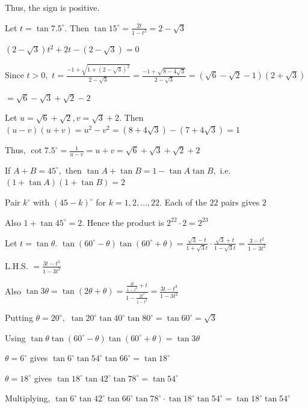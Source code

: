   Thus, the sign is positive.
\stopitemize

\subject{Challenging Problems}
\startitemize[n, 1*broad]
\item Let $t = \tan 7.5^\circ.$ Then $\tan 15^\circ = \frac{2t}{1 - t^2} = 2 - \sqrt{3}$

  $(2 - \sqrt{3})t^2 + 2t - (2 - \sqrt{3}) = 0$

  Since $t > 0,$ $t = \frac{-1 + \sqrt{1 + (2 - \sqrt{3})^2}}{2 - \sqrt{3}} = \frac{-1 + \sqrt{8 - 4\sqrt{3}}}{2 -
  \sqrt{3}} = (\sqrt{6} - \sqrt{2} - 1)(2 + \sqrt{3})$

  $= \sqrt{6} - \sqrt{3} + \sqrt{2} - 2$

  Let $u = \sqrt{6} + \sqrt{2}, v = \sqrt{3} + 2.$ Then $(u - v)(u + v) = u^2 - v^2 = (8 + 4\sqrt{3}) - (7 + 4\sqrt{3})
  = 1$

  Thus, $\cot 7.5^\circ = \frac{1}{u - v} = u + v = \sqrt{6} + \sqrt{3} + \sqrt{2} + 2$

\item If $A + B = 45^\circ,$ then $\tan A + \tan B = 1 - \tan A\tan B,$ i.e. $(1 + \tan A)(1 + \tan B) = 2$

  Pair $k^\circ$ with $(45 - k)^\circ$ for $k = 1, 2, \ldots, 22.$ Each of the $22$ pairs gives $2$

  Also $1 + \tan 45^\circ = 2.$ Hence the product is $2^{22}\cdot 2 = 2^{23}$

\item Let $t = \tan\theta.$ $\tan(60^\circ - \theta)\tan(60^\circ + \theta) = \frac{\sqrt{3} - t}{1 + \sqrt{3}t}\cdot
  \frac{\sqrt{3} + t}{1 - \sqrt{3}t} = \frac{3 - t^2}{1 - 3t^2}$

  L.H.S. $= \frac{3t - t^3}{1 - 3t^2}$

  Also $\tan 3\theta = \tan(2\theta + \theta) = \frac{\frac{2t}{1 - t^2} + t}{1 - \frac{2t^2}{1 - t^2}} = \frac{3t -
  t^3}{1 - 3t^2}$

  Putting $\theta = 20^\circ,$ $\tan 20^\circ\tan 40^\circ\tan 80^\circ = \tan 60^\circ = \sqrt{3}$

\item Using $\tan\theta\tan(60^\circ - \theta)\tan(60^\circ + \theta) = \tan 3\theta$

  $\theta = 6^\circ$ gives $\tan 6^\circ\tan 54^\circ\tan 66^\circ = \tan 18^\circ$

  $\theta = 18^\circ$ gives $\tan 18^\circ\tan 42^\circ\tan 78^\circ = \tan 54^\circ$

  Multiplying, $\tan 6^\circ\tan 42^\circ\tan 66^\circ\tan 78^\circ\cdot\tan 18^\circ\tan 54^\circ = \tan 18^\circ\tan
  54^\circ$

